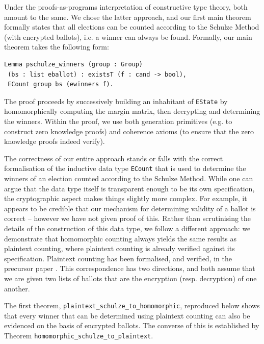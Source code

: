 \documentclass{llncs}
\begin{document}
\noindent
Under the proofs-as-programs interpretation of constructive type
theory, both amount to the same. We chose the latter approach, and
our first main theorem formally states that all elections can be
counted according to the Schulze Method (with encrypted ballots),
i.e. a winner can always be found. Formally, our main theorem takes
the following form:
\begin{lstlisting}[frame=single,basicstyle=\ttfamily\footnotesize]
Lemma pschulze_winners (group : Group) 
 (bs : list eballot) : existsT (f : cand -> bool), 
 ECount group bs (ewinners f).
\end{lstlisting}

\noindent
The proof proceeds by successively building an inhabitant of
\texttt{EState} by homomorphically computing the margin matrix, then
decrypting and determining the winners. Within the proof, we use
both generation primitives (e.g. to construct zero knowledge proofs)
and coherence axioms (to ensure that the zero knowledge proofs
indeed verify). 

The correctness of our entire approach stands or falls with the
correct formalisation of the inductive data type \texttt{ECount}
that is used to determine the winners of an election counted
according to the Schulze Method. While one can argue that the data
type itself is transparent enough to be its own specification,
the cryptographic aspect makes things slightly more complex. For
example, it appears to be credible that our mechanism for
determining validity of a ballot is correct -- however we have not
given proof of this. Rather than scrutinising the details of the
construction of this data type, we follow a different approach: we
demonstrate that homomorphic counting always yields the same results
as plaintext counting, where plaintext counting is already verified
against its specification. Plaintext counting has been formalised,
and verified, in the precursor paper \cite{Pattinson:2017:SVE}. This
correspondence has two directions, and both assume that we are given
two lists of ballots that are the encryption (resp. decryption) of
one another. 

The first theorem, \texttt{plaintext\_schulze\_to\_homomorphic}, reproduced below shows
that every winner that can be determined using plaintext counting
can also be evidenced on the basis of encrypted ballots. The
converse of this is established by 
Theorem \texttt{homomorphic\_schulze\_to\_plaintext}.
\end{document}
